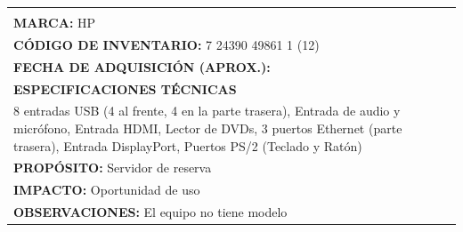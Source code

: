 \begin{table}[H]
\begin{tabular}{|p{}|p{}|}
{\textbf{MODELO:} Desconocido & \\ \cline{1-1}
\textbf{MARCA:} HP & \\ \cline{1-1}
\textbf{CÓDIGO DE INVENTARIO:} 7 24390 49861 1 (12) & \\ \cline{1-1}
\textbf{FECHA DE ADQUISICIÓN (APROX.):} & \\ \hline
\multicolumn{2}{|l|}{\textbf{ESPECIFICACIONES TÉCNICAS}} \\ \hline
\multicolumn{2}{|p{0.95\textwidth}|}{
\footnotesize
8 entradas USB (4 al frente, 4 en la parte trasera), Entrada de audio y micrófono, Entrada HDMI, Lector de DVDs, 3 puertos Ethernet (parte trasera), Entrada DisplayPort, Puertos PS/2 (Teclado y Ratón)
} \\ \hline
\multicolumn{2}{|l|}{\textbf{PROPÓSITO:} Servidor de reserva} \\ \hline
\multicolumn{2}{|l|}{\textbf{IMPACTO:} Oportunidad de uso} \\ \hline
\multicolumn{2}{|l|}{\textbf{OBSERVACIONES:} El equipo no tiene modelo} \\ \hline
\end{tabular}
\end{table}

